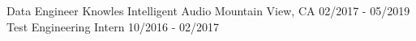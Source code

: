 \begin{cventries}
\cventryupdate
    {Data Engineer} %
    {Knowles Intelligent Audio} %
    {Mountain View, CA} %
    {02/2017 - 05/2019} %
    {Test Engineering Intern} %
    {10/2016 - 02/2017} %
    {
      \begin{cvitems} %
      \end{cvitems}
    }
    \vspace{-7.0mm} 

\end{cventries}
